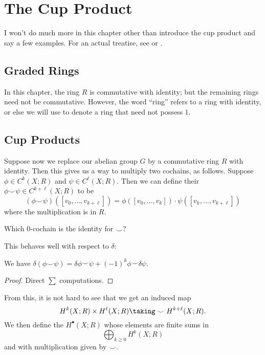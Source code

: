 \documentclass[11pt]{scrreprt}
\begin{document}
\chapter{The Cup Product}
I won't do much more in this chapter other than
introduce the cup product and say a few examples.
For an actual treatise, see \cite{ref:hatcher} or \cite{ref:maxim752}.

\section{Graded Rings}
In this chapter, the ring $R$ is commutative with identity;
but the remaining rings need not be commutative.
However, the word ``ring'' refers to a ring with identity,
or else we will use  to denote a ring that need not possess $1$.



\section{Cup Products}
Suppose now we replace our abelian group $G$ by a commutative ring $R$ with identity.
Then this gives us a way to multiply two cochains, as follows.
Suppose $\phi \in C^k(X;R)$ and $\psi \in C^\ell(X;R)$.
Then we can define their 
$\phi\smile\psi \in C^{k+\ell}(X;R)$ to be
\[
	(\phi\smile\psi)([v_0, \dots, v_{k+\ell}])
	= 
	\phi\left( [v_0, \dots, v_k] \right)
	\cdot
	\psi\left( [v_k, \dots, v_{k+\ell}] \right)
\]
where the multiplication is in $R$.

\begin{ques}
	Which $0$-cochain is the identity for $\smile$?
\end{ques}

This behaves well with respect to $\delta$:
\begin{lemma}
	We have
	$\delta(\phi\smile\psi) = \delta\phi\smile\psi + (-1)^k\phi\smile\delta\psi$.
\end{lemma}
\begin{proof}
	Direct $\sum$ computations.
\end{proof}
From this, it is not hard to see that we get an induced map
\[ H^k(X;R) \times H^\ell(X;R) \taking\smile H^{k+\ell}(X;R).  \]
We then define the  $H^\bullet(X;R)$
whose elements are finite sums in 
\[ \bigoplus_{k \ge 0} H^k(X;R) \]
and with multiplication given by $\smile$.
\end{document}
